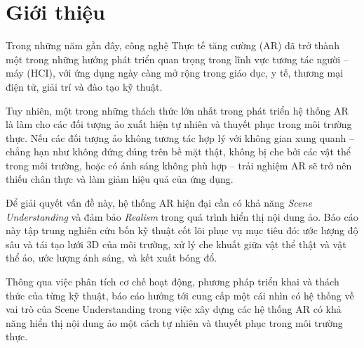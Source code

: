 \newpage
\section{Giới thiệu}

Trong những năm gần đây, công nghệ Thực tế tăng cường (AR) đã trở thành một trong những hướng phát triển quan trọng trong lĩnh vực tương tác người -- máy (HCI), với ứng dụng ngày càng mở rộng trong giáo dục, y tế, thương mại điện tử, giải trí và đào tạo kỹ thuật.

Tuy nhiên, một trong những thách thức lớn nhất trong phát triển hệ thống AR là làm cho các đối tượng ảo xuất hiện tự nhiên và thuyết phục trong môi trường thực. Nếu các đối tượng ảo không tương tác hợp lý với không gian xung quanh -- chẳng hạn như không đứng đúng trên bề mặt thật, không bị che bởi các vật thể trong môi trường, hoặc có ánh sáng không phù hợp -- trải nghiệm AR sẽ trở nên thiếu chân thực và làm giảm hiệu quả của ứng dụng.

Để giải quyết vấn đề này, hệ thống AR hiện đại cần có khả năng \textit{Scene Understanding} và đảm bảo \textit{Realism} trong quá trình hiển thị nội dung ảo. Báo cáo này tập trung nghiên cứu bốn kỹ thuật cốt lõi phục vụ mục tiêu đó: ước lượng độ sâu và tái tạo lưới 3D của môi trường, xử lý che khuất giữa vật thể thật và vật thể ảo, ước lượng ánh sáng, và kết xuất bóng đổ.

Thông qua việc phân tích cơ chế hoạt động, phương pháp triển khai và thách thức của từng kỹ thuật, báo cáo hướng tới cung cấp một cái nhìn có hệ thống về vai trò của Scene Understanding trong việc xây dựng các hệ thống AR có khả năng hiển thị nội dung ảo một cách tự nhiên và thuyết phục trong môi trường thực.